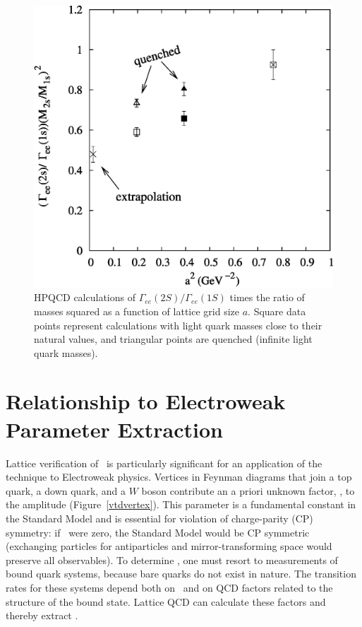 \documentclass{cornell}
\begin{document}
\begin{figure}[p]
  \begin{center}
    \includegraphics[width=\linewidth]{latticespacing}
  \end{center}
  \caption[HPQCD results for
  $\Gamma_{ee}(2S)/\Gamma_{ee}(1S)$]{\label{latticespacing} HPQCD
  calculations of $\Gamma_{ee}(2S)/\Gamma_{ee}(1S)$ times the ratio of
  masses squared as a function of lattice grid size $a$.  Square data
  points represent calculations with light quark masses close to their
  natural values, and triangular points are quenched (infinite light
  quark masses).}
\end{figure}

\section{Relationship to Electroweak Parameter Extraction}

Lattice verification of \gee\ is particularly significant for an
application of the technique to Electroweak physics.  Vertices in
Feynman diagrams that join a top quark, a down quark, and a $W$ boson
contribute an a priori unknown factor, \vtd, to the amplitude
(Figure~\ref{vtdvertex}).  This parameter is a fundamental constant in
the Standard Model and is essential for violation of charge-parity
(CP) symmetry: if \vtd\ were zero, the Standard Model would be CP
symmetric (exchanging particles for antiparticles and
mirror-transforming space would preserve all observables).  To
determine \vtd, one must resort to measurements of bound quark
systems, because bare quarks do not exist in nature.  The transition
rates for these systems depend both on \vtd\ and on QCD factors
related to the structure of the bound state.  Lattice QCD can
calculate these factors and thereby extract \vtd.
\end{document}

